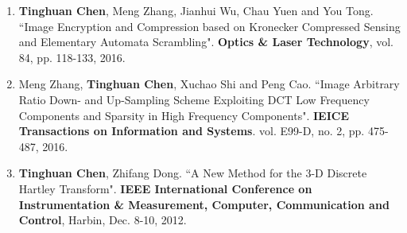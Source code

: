 \documentclass[letterpaper,11pt]{article}%
\begin{document}
\begin{enumerate}[(1)]
\item \textbf{Tinghuan Chen}, Meng Zhang, Jianhui Wu, Chau Yuen and You Tong. ``Image Encryption and Compression based on Kronecker Compressed Sensing and Elementary Automata Scrambling". \textbf{Optics \& Laser Technology}, vol. 84, pp. 118-133, 2016.

\item Meng Zhang, \textbf{Tinghuan Chen}, Xuchao Shi and Peng Cao. ``Image Arbitrary Ratio Down- and Up-Sampling Scheme Exploiting DCT Low Frequency Components and Sparsity in High Frequency Components". \textbf{IEICE Transactions on Information and Systems}. vol. E99-D, no. 2, pp. 475-487, 2016.


\item \textbf{Tinghuan Chen}, Zhifang Dong. ``A New Method for the 3-D Discrete Hartley Transform". \textbf{IEEE International Conference on Instrumentation \& Measurement, Computer, Communication and Control}, Harbin, Dec. 8-10, 2012.







\end{enumerate}
\end{document}
